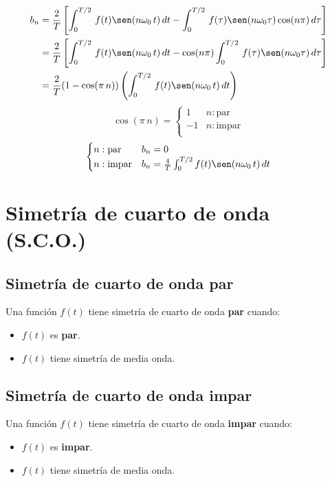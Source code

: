 \begin{equation*}
\begin{split}
    b_n
        &=\frac{2}{T}\left[
            \int_0^{T/2}\,f(t)\sen(n\omega_0\,t)\,dt-
            \int_0^{T/2}\,f(\tau)\sen(n\omega_0\tau)\cos(n\pi)\,d\tau
        \right]\\
        &=\frac{2}{T}\left[
            \int_0^{T/2}\,f(t)\sen(n\omega_0\,t)\,dt-
            \cos(n\pi)\int_0^{T/2}\,f(\tau)\sen(n\omega_0\tau)\,d\tau
        \right]\\
        &=\frac{2}{T}(1-\cos(\pi\,n))\left(
            \int_0^{T/2}\,f(t)\sen(n\omega_0\,t)\,dt
        \right)\\
\end{split}
\end{equation*}
\begin{equation*}
    \cos(\pi\,n)=\begin{cases}
        1&n:\text{par}\\
        -1&n:\text{impar}\\
    \end{cases}
\end{equation*}
\begin{equation}
\begin{cases}
    n:\text{par}&b_n=0\\
    n:\text{impar}&b_n=\frac{4}{T}\int_0^{T/2}f(t)\sen(n\omega_0\,t)\,dt\\
\end{cases}
\end{equation}

\section{Simetría de cuarto de onda (S.C.O.)}
\subsection{Simetría de cuarto de onda par}
Una función $f(t)$ tiene simetría de cuarto de onda \textbf{par} cuando:
\begin{itemize}
    \item $f(t)$ es \textbf{par}.
    \item $f(t)$ tiene simetría de media onda.
\end{itemize}
\begin{figure}[H]
    \centering
    
\end{figure}

\subsection{Simetría de cuarto de onda impar}
Una función $f(t)$ tiene simetría de cuarto de onda \textbf{impar} cuando:
\begin{itemize}
    \item $f(t)$ es \textbf{impar}.
    \item $f(t)$ tiene simetría de media onda.
\end{itemize}
\begin{figure}[H]
    \centering
    
\end{figure}

